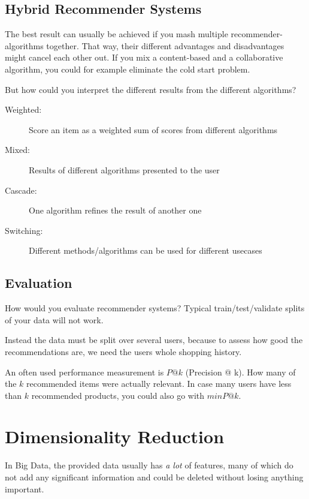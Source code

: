 \documentclass[11pt]{article}
\begin{document}
\subsection{Hybrid Recommender Systems}

The best result can usually be achieved if you mash multiple recommender-algorithms together. That way, their different advantages and disadvantages might cancel each other out. If you mix a content-based and a collaborative algorithm, you could for example eliminate the cold start problem.

But how could you interpret the different results from the different algorithms?

\begin{description}
    \item[Weighted: ] Score an item as a weighted sum of scores from different algorithms
    \item[Mixed: ] Results of different algorithms presented to the user
    \item[Cascade: ] One algorithm refines the result of another one
    \item[Switching: ] Different methods/algorithms can be used for different usecases
\end{description}

\subsection{Evaluation}

How would you evaluate recommender systems? Typical train/test/validate splits of your data will not work.

Instead the data must be split over several users, because to assess how good the recommendations are, we need the users whole shopping history.

\vspace{10px}

An often used performance measurement is $P@k$ (Precision @ k). How many of the $k$ recommended items were actually relevant. In case many users have less than $k$ recommended products, you could also go with $minP@k$.

\section{Dimensionality Reduction}

In Big Data, the provided data usually has \textit{a lot} of features, many of which do not add any significant information and could be deleted without losing anything important.
\end{document}
